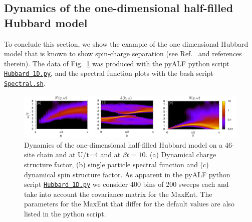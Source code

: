  \subsection{Dynamics of the one-dimensional half-filled Hubbard model}

To conclude this section, we show the example of the one dimensional Hubbard model that is known to show spin-charge separation (see Ref.~\cite{Abendschein06}  and references therein).    The data of Fig.~\ref{Fig:Spectral1D}    was produced with the pyALF python script  \href{https://git.physik.uni-wuerzburg.de/ALF/ALF/-/blob/master/Documentation/Figures/MaxEnt/Hubbard_1D.py}{\texttt{Hubbard\_1D.py}}, and   the spectral function plots with the bash script \href{https://git.physik.uni-wuerzburg.de/ALF/ALF/-/blob/master/Documentation/Figures/MaxEnt/Spectral.sh}{\texttt{Spectral.sh}}. 

\begin{figure}
\center
\includegraphics[width=\textwidth,clip]{Figures/MaxEnt/Spectral_1D.pdf}

\caption{Dynamics of the one-dimensional half-filled Hubbard model  on a 46-site chain   and at U/t=4 and at $\beta t = 10$.  (a) Dynamical charge structure factor, (b) single particle spectral function and (c) dynamical spin structure factor.   As apparent in the pyALF python script 
 \href{https://git.physik.uni-wuerzburg.de/ALF/ALF/-/blob/master/Documentation/Figures/MaxEnt/Hubbard_1D.py}{\texttt{Hubbard\_1D.py}}  we consider 400  bins of 200 sweeps  each and  take into account the covariance matrix for the MaxEnt.  The parameters for the MaxEnt  that differ for the default values are also listed in the  python script.}
        \label{Fig:Spectral1D}
\end{figure}
